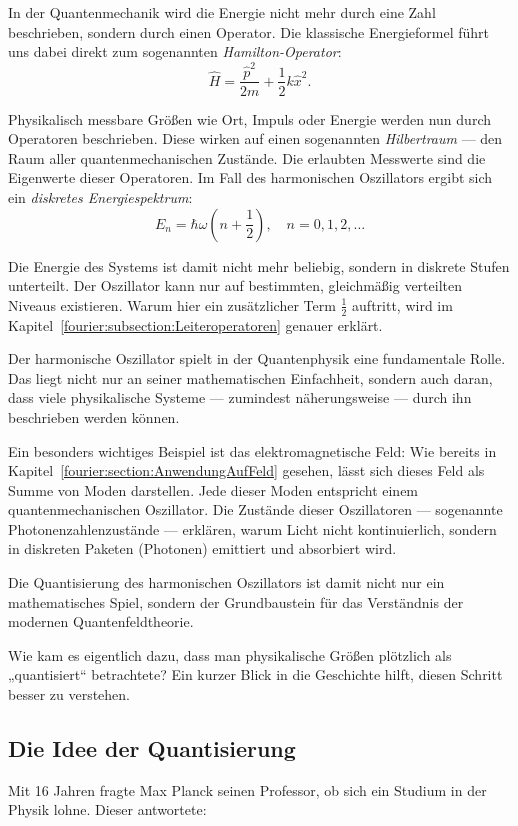 In der Quantenmechanik wird die Energie nicht mehr durch eine Zahl beschrieben, sondern durch einen Operator.  
Die klassische Energieformel führt uns dabei direkt zum sogenannten \emph{Hamilton-Operator}:
\begin{equation}
\hat{H} = \frac{\hat{p}^2}{2m} + \frac{1}{2} k \hat{x}^2.
\label{fourier:equation:derQMHO}
\end{equation}

Physikalisch messbare Größen wie Ort, Impuls oder Energie werden nun durch Operatoren beschrieben.  
Diese wirken auf einen sogenannten \emph{Hilbertraum} — den Raum aller quantenmechanischen Zustände.  
Die erlaubten Messwerte sind die Eigenwerte dieser Operatoren.  
Im Fall des harmonischen Oszillators ergibt sich ein \emph{diskretes Energiespektrum}:
\[
E_n = \hbar \omega \left(n + \frac{1}{2} \right), \quad n = 0, 1, 2, \dots
\]

Die Energie des Systems ist damit nicht mehr beliebig, sondern in diskrete Stufen unterteilt.  
Der Oszillator kann nur auf bestimmten, gleichmäßig verteilten Niveaus existieren.
Warum hier ein zusätzlicher Term $\frac{1}{2}$ auftritt, wird im Kapitel~\ref{fourier:subsection:Leiteroperatoren} genauer erklärt.

Der harmonische Oszillator spielt in der Quantenphysik eine fundamentale Rolle.  
Das liegt nicht nur an seiner mathematischen Einfachheit, sondern auch daran, dass viele physikalische Systeme — zumindest näherungsweise — durch ihn beschrieben werden können.

Ein besonders wichtiges Beispiel ist das elektromagnetische Feld:  
Wie bereits in Kapitel~\ref{fourier:section:AnwendungAufFeld} gesehen, lässt sich dieses Feld als Summe von Moden darstellen.  
Jede dieser Moden entspricht einem quantenmechanischen Oszillator.  
Die Zustände dieser Oszillatoren — sogenannte Photonenzahlenzustände — erklären, warum Licht nicht kontinuierlich, sondern in diskreten Paketen (Photonen) emittiert und absorbiert wird.

\vspace{1em}

Die Quantisierung des harmonischen Oszillators ist damit nicht nur ein mathematisches Spiel, sondern der Grundbaustein für das Verständnis der modernen Quantenfeldtheorie.

Wie kam es eigentlich dazu, dass man physikalische Größen plötzlich als „quantisiert“ betrachtete?  
Ein kurzer Blick in die Geschichte hilft, diesen Schritt besser zu verstehen.

\subsection{Die Idee der Quantisierung\label{fourier:subsection:DieIdeeDerQuantisierung}}
	Mit 16 Jahren fragte Max Planck seinen Professor, ob sich ein Studium in der Physik lohne. 
	Dieser antwortete:
	

